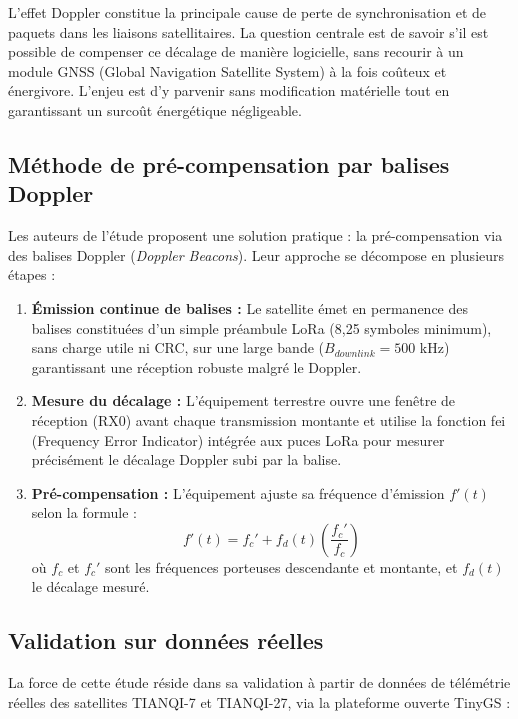 L'effet Doppler constitue la principale cause de perte de synchronisation et de paquets dans les liaisons satellitaires. La question centrale est de savoir s’il est possible de compenser ce décalage de manière logicielle, sans recourir à un module GNSS (Global Navigation Satellite System) à la fois coûteux et énergivore. L'enjeu est d'y parvenir sans modification matérielle tout en garantissant un surcoût énergétique négligeable.

\subsection{Méthode de pré-compensation par balises Doppler}

Les auteurs de l'étude \cite{ullah_extending_doppler_2025} proposent une solution pratique : la pré-compensation via des balises Doppler (\textit{Doppler Beacons}). Leur approche se décompose en plusieurs étapes :

\begin{enumerate}
	\item \textbf{Émission continue de balises :} Le satellite émet en permanence des balises constituées d'un simple préambule LoRa (8,25 symboles minimum), sans charge utile ni CRC, sur une large bande ($B_{downlink} = 500$ kHz) garantissant une réception robuste malgré le Doppler.
	
	\item \textbf{Mesure du décalage :} L'équipement terrestre ouvre une fenêtre de réception (RX0) avant chaque transmission montante et utilise la fonction \gls{fei} (Frequency Error Indicator) intégrée aux puces LoRa pour mesurer précisément le décalage Doppler subi par la balise.
	
	\item \textbf{Pré-compensation :} L'équipement ajuste sa fréquence d'émission $f'(t)$ selon la formule :
	\[f'(t) = f_c' + f_d(t)\left(\frac{f_c'}{f_c}\right)\]
	où $f_c$ et $f_c'$ sont les fréquences porteuses descendante et montante, et $f_d(t)$ le décalage mesuré.
\end{enumerate}

\subsection{Validation sur données réelles}

La force de cette étude réside dans sa validation à partir de données de télémétrie réelles des satellites TIANQI-7 et TIANQI-27, via la plateforme ouverte TinyGS :

